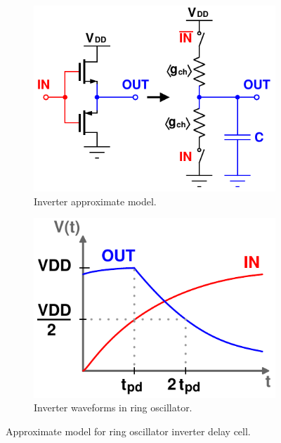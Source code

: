 		\begin{figure}[htb!]
	        \centering
	        \begin{subfigure}{.5\textwidth}
	            \centering
	            \includegraphics[width=\linewidth]{figs/design/inv_rc_model}
	            \caption{Inverter approximate model.}
	            \label{fig:inv_cir}
	        \end{subfigure}%
	        \begin{subfigure}{.5\textwidth}
	            \centering
	            \includegraphics[width=0.8\linewidth]{figs/design/inv_waves}
	            \caption{Inverter waveforms in ring oscillator.}
	            \label{fig:inv_wave}
	        \end{subfigure}
	        \caption{Approximate model for ring oscillator inverter delay cell.}
	        \label{fig:inv_model}
	    \end{figure}

